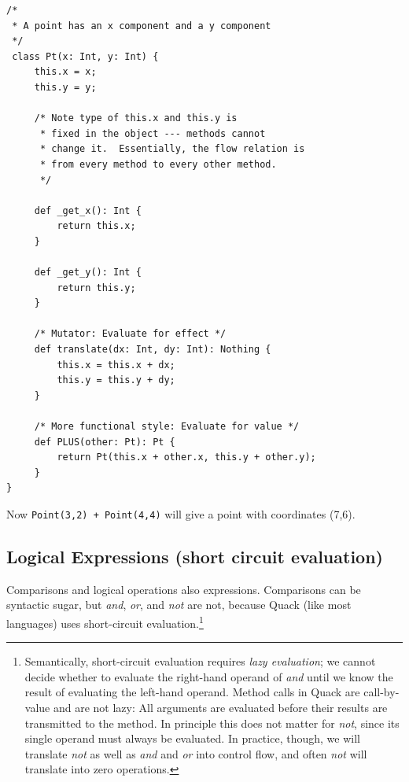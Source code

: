 \documentclass[11pt]{article}
\begin{document}
\begin{verbatim}
/*
 * A point has an x component and a y component
 */
 class Pt(x: Int, y: Int) {
     this.x = x;
     this.y = y;

     /* Note type of this.x and this.y is
      * fixed in the object --- methods cannot
      * change it.  Essentially, the flow relation is
      * from every method to every other method.
      */

     def _get_x(): Int {
         return this.x; 
     } 

     def _get_y(): Int {
         return this.y;
     }

     /* Mutator: Evaluate for effect */
     def translate(dx: Int, dy: Int): Nothing {
         this.x = this.x + dx;
         this.y = this.y + dy;
     }

     /* More functional style: Evaluate for value */
     def PLUS(other: Pt): Pt {
         return Pt(this.x + other.x, this.y + other.y); 
     }
}
\end{verbatim}

Now \verb|Point(3,2) + Point(4,4)| will give a point with coordinates
(7,6). 

\subsection{Logical Expressions (short circuit evaluation)}

Comparisons and logical operations also expressions.  Comparisons can
be syntactic sugar, but \emph{and}, \emph{or}, and \emph{not} are
not, because Quack (like most languages) uses short-circuit
evaluation.\footnote{Semantically, short-circuit evaluation requires
  \emph{lazy evaluation};  we cannot decide whether to evaluate the
  right-hand operand of \emph{and} until we know the result of
  evaluating the left-hand operand.  Method calls in Quack are
  call-by-value and are not
  lazy:  All arguments are evaluated before their results are
  transmitted to the method.  In principle this does not matter for
  \emph{not}, since its single operand must always be evaluated.  In
  practice, though, we will translate \emph{not} as well as \emph{and}
  and \emph{or} into control flow, and often \emph{not} will translate
  into zero operations.}
\end{document}
